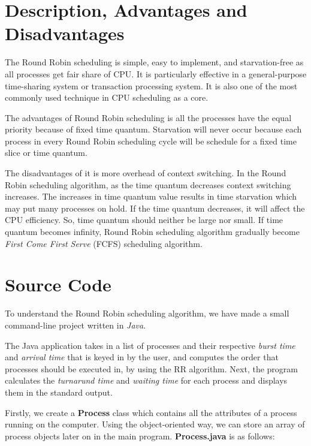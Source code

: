 \documentclass[12pt]{article}
\begin{document}
 \newpage 
 \section{Description, Advantages and Disadvantages}

The Round Robin scheduling is simple, easy to implement, and starvation-free as
all processes get fair share of CPU. It is particularly effective in a
general-purpose time-sharing system or transaction processing system. It is also
one of the most commonly used technique in CPU scheduling as a core.

The advantages of Round Robin scheduling is all the processes have the equal
priority because of fixed time quantum. Starvation will never occur because each
process in every Round Robin scheduling cycle will be schedule for a fixed time
slice or time quantum.

The disadvantages of it is more overhead of context switching. In the Round
Robin scheduling algorithm, as the time quantum decreases context switching
increases. The increases in time quantum value results in time starvation which
may put many processes on hold. If the time quantum decreases, it will affect
the CPU efficiency. So, time quantum should neither be large nor small. If time
quantum becomes infinity, Round Robin scheduling algorithm gradually become
\textit{First Come First Serve} (FCFS) scheduling algorithm.

\newpage
\section{Source Code}

To understand the Round Robin scheduling algorithm, we have made a small
command-line project written in \textit{Java}.

The Java application takes in a list of processes and their respective
\textit{burst time} and \textit{arrival time} that is keyed in by the user, and
computes the order that processes should be executed in, by using the RR
algorithm. Next, the program calculates the \textit{turnarund time} and
\textit{waiting time} for each process and displays them in the standard output.

Firstly, we create a \textbf{Process} class which contains all the attributes of
a process running on the computer. Using the object-oriented way, we can store
an array of process objects later on in the main program. \textbf{Process.java} is as follows:
\end{document}
